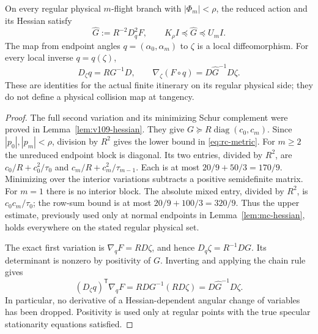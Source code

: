 \begin{lemma}
\label{lem:rc-metric}
On every regular physical $m$-flight branch with $|\Phi_m|<\rho$, the
reduced action and its Hessian satisfy
\begin{equation}\label{eq:rc-metric}
 \widehat G:=R^{-2}D_q^2F,\qquad
 K_\rho I\preceq\widehat G\preceq U_m I.
\end{equation}
The map from endpoint angles $q=(\alpha_0,\alpha_m)$ to $\zeta$ is a
local diffeomorphism. For every local inverse $q=q(\zeta)$,
\begin{equation}\label{eq:rc-gradient}
 D_\zeta q=R G^{-1}D,\qquad
 \nabla_\zeta(F\circ q)=D\widehat G^{-1}D\zeta.
\end{equation}
These are identities for the actual finite itinerary on its regular
physical side; they do not define a physical collision map at tangency.
\end{lemma}
\begin{proof}
The full second variation and its minimizing Schur complement were
proved in Lemma~\ref{lem:v109-hessian}. They give
$G\succeq R\operatorname{diag}(c_0,c_m)$. Since
$|p_0|,|p_m|<\rho$, division by $R^2$ gives the lower bound in
\eqref{eq:rc-metric}. For $m\ge2$ the unreduced endpoint block is
 diagonal. Its two entries, divided by $R^2$, are
$c_0/R+c_0^2/\tau_0$ and $c_m/R+c_m^2/\tau_{m-1}$.
Each is at most $20/9+50/3=170/9$. Minimizing over the interior
variations subtracts a positive semidefinite matrix. For $m=1$ there
is no interior block. The absolute mixed entry, divided by $R^2$,
is $c_0c_m/\tau_0$; the row-sum bound is at most
$20/9+100/3=320/9$. Thus the upper estimate, previously used only at
normal endpoints in Lemma~\ref{lem:mc-hessian}, holds everywhere on
the stated regular physical set.

The exact first variation is $\nabla_qF=RD\zeta$, and hence
$D_q\zeta=R^{-1}DG$. Its determinant is nonzero by positivity of
$G$. Inverting and applying the chain rule gives
\[
 (D_\zeta q)^{\mathsf T}\nabla_qF
 =R D G^{-1}(RD\zeta)=D\widehat G^{-1}D\zeta.
\]
In particular, no derivative of a Hessian-dependent angular change of
variables has been dropped. Positivity is used only at regular
points with the true specular stationarity equations satisfied.
\end{proof}

